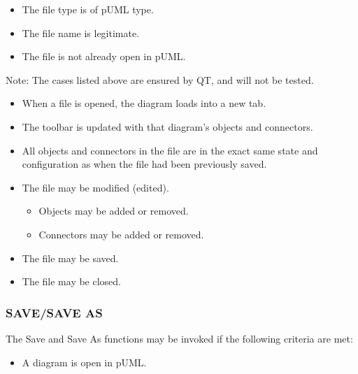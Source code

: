 \documentclass[twoside,letterpaper]{article}
\begin{document}
\begin{itemize}
\item The file type is of pUML type.
\item The file name is legitimate.
\item The file is not already open in pUML.
\end{itemize}

\newline Note: The cases listed above are ensured by QT, and will not be tested.
\newline 

\begin{itemize}
\item When a file is opened, the diagram loads into a new tab.
\item The toolbar is updated with that diagram's objects and connectors.
\item All objects and connectors in the file are in the exact same state and configuration as when the file had been previously saved.
\item The file may be modified (edited).
\begin{itemize}
\item Objects may be added or removed.
\item Connectors may be added or removed.
\end{itemize}
\item The file may be saved.
\item The file may be closed.
\end{itemize}

\bigskip

\subsubsection[SAVE]{\bfseries SAVE/SAVE AS}

The Save and Save As functions may be invoked if the following criteria are met: 
\begin{itemize}
\item A diagram is open in pUML.
\end{itemize}
\end{document}
